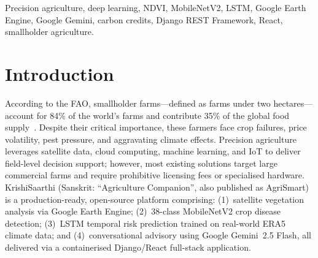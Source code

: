 \documentclass[conference]{IEEEtran}
\begin{document}
\begin{abstract}
Financial fragmentation, insect outbreaks, and climate instability are just a few of the major issues that small farmers confront globally. These issues are made worse by the lack of access to agricultural advisory services. Due to expensive license fees and technology requirements, smallholders are still mostly unable to utilize current precision agriculture solutions. This paper introduces KrishiSaarthi, an open-source, production-ready intelligent farm management platform that combines deep learning, large language models, and satellite remote sensing into a single end-to-end full-stack solution. The platform consists of a Django REST Framework backend with 45 REST endpoints, a React~18/TypeScript frontend with 21 dashboard modules, a PyTorch ML engine with a 208~KB two-layer LSTM risk forecasting model (97.56\% accuracy, AUC-ROC~0.9983 on ERA5 reanalysis data spanning 25 Indian districts) and a 9.1~MB MobileNetV2 38-class crop disease classifier (99.03\% top-1 accuracy on PlantVillage). Google Earth Engine provides satellite analytics (NDVI, EVI, SAVI, NDWI), and the IPCC Tier~2 technique with AWD cycle identification is used for carbon credit estimation. The system introduces three contributions---integrated profit-and-loss management, IPCC-compliant carbon credit estimation, and LLM-powered conversational advisory---that are absent from all 17~reviewed works and fully covers five of the six identified agricultural management problem dimensions.
\end{abstract}

\begin{IEEEkeywords}
Precision agriculture, deep learning, NDVI, MobileNetV2, LSTM, Google Earth Engine, Google Gemini, carbon credits, Django REST Framework, React, smallholder agriculture.
\end{IEEEkeywords}

\section{Introduction}

According to the FAO, smallholder farms---defined as farms under two hectares---account for 84\% of the world's farms and contribute 35\% of the global food supply~\cite{b16}. Despite their critical importance, these farmers face crop failures, price volatility, pest pressure, and aggravating climate effects. Precision agriculture leverages satellite data, cloud computing, machine learning, and IoT to deliver field-level decision support; however, most existing solutions target large commercial farms and require prohibitive licensing fees or specialised hardware. KrishiSaarthi (Sanskrit: ``Agriculture Companion'', also published as AgriSmart) is a production-ready, open-source platform comprising: (1)~satellite vegetation analysis via Google Earth Engine; (2)~38-class MobileNetV2 crop disease detection; (3)~LSTM temporal risk prediction trained on real-world ERA5 climate data; and (4)~conversational advisory using Google Gemini~2.5 Flash, all delivered via a containerised Django/React full-stack application.
\end{document}
